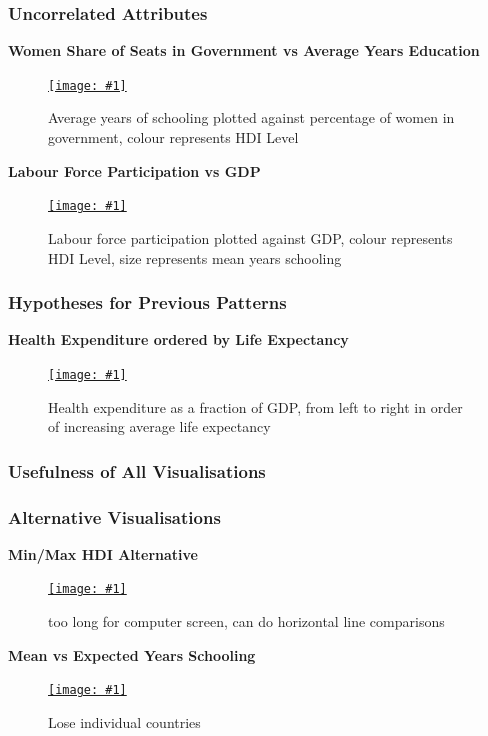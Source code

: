 \documentclass[11pt,a4paper,final]{article}
\newcommand\onlinefig[3]{
\begin{figure}[H]
  \centering
  \href{#3}{\texttt{[image: \#1]}}
  \caption{#2} 
  \label{fig:#1}
\end{figure}
}
\begin{document}
\begin{multicols}{2}
\subsubsection{Uncorrelated Attributes}
\textbf{Women Share of Seats in Government vs Average Years Education}
\onlinefig{percentage_women_in_government_vs_mean_years_education_scatterplot.png}{Average years of schooling plotted against percentage of women in government, colour represents HDI Level}{https://public.tableau.com/views/CS3205-HDI/Sheet12?:language=en-GB&:display_count=n&:origin=viz_share_link}

\begin{flushleft}
\textbf{Labour Force Participation vs GDP}
\end{flushleft}
\onlinefig{labour_force_participation_vs_gdp_scatterplot}{Labour force participation plotted against GDP, colour represents HDI Level, size represents mean years schooling}{https://public.tableau.com/views/CS3205-HDI/Sheet13?:language=en-GB&:display_count=n&:origin=viz_share_link}

\subsubsection{Hypotheses for Previous Patterns}
\begin{flushleft}
\textbf{Health Expenditure ordered by Life Expectancy}
\end{flushleft}
\onlinefig{health_expenditure_ordered_by_life_expectancy}{Health expenditure as a fraction of GDP, from left to right in order of increasing average life expectancy}{https://public.tableau.com/views/CS3205-HDI/Sheet9?:language=en-GB&:display_count=n&:origin=viz_share_link}

\subsubsection{Usefulness of All Visualisations}


\subsubsection{Alternative Visualisations}
\begin{flushleft}
\textbf{Min/Max HDI Alternative}
\end{flushleft}
\onlinefig{min_vs_max_hdi_sidebysidecircleplot}{too long for computer screen, can do horizontal line comparisons}{https://public.tableau.com/views/CS3205_hdi_csv/Sheet1?:language=en-GB&:display_count=n&:origin=viz_share_link}

\begin{flushleft}
\textbf{Mean vs Expected Years Schooling}
\end{flushleft}
\onlinefig{mean_vs_expected_years_schooling_bar_and_linegraph}{Lose individual countries}{https://public.tableau.com/views/CS3205-HDI/Sheet4?:language=en-GB&:display_count=n&:origin=viz_share_link}

\end{multicols}
\pagebreak
\end{document}
